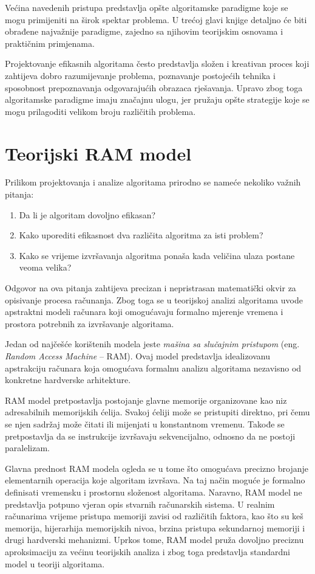 Većina navedenih pristupa predstavlja opšte algoritamske paradigme koje se mogu primijeniti na širok spektar problema. U trećoj glavi knjige detaljno će biti obrađene najvažnije paradigme, zajedno sa njihovim teorijskim osnovama i praktičnim primjenama.

Projektovanje efikasnih algoritama često predstavlja složen i kreativan proces koji zahtijeva dobro razumijevanje problema, poznavanje postojećih tehnika i sposobnost prepoznavanja odgovarajućih obrazaca rješavanja. Upravo zbog toga algoritamske paradigme imaju značajnu ulogu, jer pružaju opšte strategije koje se mogu prilagoditi velikom broju različitih problema.


\section{Teorijski RAM model}

Prilikom projektovanja i analize algoritama prirodno se nameće nekoliko važnih pitanja:

\begin{enumerate}
	\item Da li je algoritam dovoljno efikasan?
	\item Kako uporediti efikasnost dva različita algoritma za isti problem?
	\item Kako se vrijeme izvršavanja algoritma ponaša kada veličina ulaza postane veoma velika?
\end{enumerate}

Odgovor na ova pitanja zahtijeva precizan i nepristrasan  matematički okvir za opisivanje procesa računanja. Zbog toga se u teorijskoj analizi algoritama uvode apstraktni modeli računara koji omogućavaju formalno mjerenje vremena i prostora potrebnih za izvršavanje algoritama.

Jedan od najčešće korištenih modela jeste \textit{mašina sa slučajnim pristupom} (eng. \textit{Random Access Machine} -- RAM). Ovaj model predstavlja idealizovanu apstrakciju računara koja omogućava formalnu analizu algoritama nezavisno od konkretne hardverske arhitekture.

RAM model pretpostavlja postojanje glavne memorije organizovane kao niz adresabilnih memorijskih ćelija. Svakoj ćeliji može se pristupiti direktno, pri čemu se njen sadržaj može čitati ili mijenjati u konstantnom vremenu. Takođe se pretpostavlja da se instrukcije izvršavaju sekvencijalno, odnosno da ne postoji paralelizam.

Glavna prednost RAM modela ogleda se u tome što omogućava precizno brojanje elementarnih operacija koje algoritam izvršava. Na taj način moguće je formalno definisati vremensku i prostornu složenost algoritama. Naravno, RAM model ne predstavlja potpuno vjeran opis stvarnih računa\-rskih sistema. U realnim računarima vrijeme pristupa memoriji zavisi od različitih faktora, kao što su keš memorija, hijerarhija memorijskih nivoa, brzina pristupa sekundarnoj memoriji i drugi hardverski mehanizmi. Uprkos tome, RAM model pruža dovoljno preciznu aproksimaciju za većinu teorijskih analiza i zbog toga predstavlja standardni model u teoriji algoritama.

